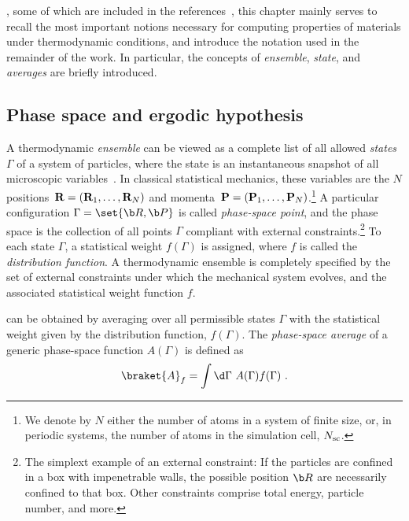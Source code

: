 , some of which are included in the references~\cite{Phillies2012,Tuckerman,Schrodinger1989}, this chapter mainly serves to recall the most important notions necessary for computing properties of materials under thermodynamic conditions, and introduce the notation used in the remainder of the work. In particular, the concepts of \emph{ensemble}, \emph{state}, and \emph{averages} are briefly introduced.

\subsection{Phase space and ergodic hypothesis}
\label{sec:phase_space}

A thermodynamic \emph{ensemble} can be viewed as a complete list of all allowed \emph{states} $\Gamma$ of a system of particles, where the state is an instantaneous snapshot of all microscopic variables~\cite{Phillies2012}. In classical statistical mechanics, these variables are the $N$ positions~${\bf R} = ({\bf R}_1, \ldots, {\bf R}_{N})$ and momenta~${\bf P} = ({\bf P}_1, \ldots, {\bf P}_{N})$.\footnote{We denote by $N$ either the number of atoms in a system of finite size, or, in periodic systems, the number of atoms in the simulation cell, $N_{\rm sc}$.} A particular configuration $\Gamma = \set{\b R, \b P}$ is called \emph{phase-space point}, and the phase space is the collection of all points $\Gamma$ compliant with external constraints.\footnote{The simplext example of an external constraint: If the particles are confined in a box with impenetrable walls, the possible position $\b R$ are necessarily confined to that box. Other constraints comprise total energy, particle number, and more.} To each state $\Gamma$, a statistical weight $f (\Gamma)$ is assigned, where $f$ is called the \emph{distribution function}. A thermodynamic ensemble is completely specified by the set of external constraints under which the mechanical system evolves, and the associated statistical weight function $f$.

 can be obtained by averaging over all permissible states $\Gamma$ with the statistical weight given by the distribution function, $f (\Gamma)$. The \emph{phase-space average} of a generic phase-space function $A (\Gamma)$ is defined as
\begin{align}
  \braket{A}_f 
    = \int \d \Gamma ~ A(\Gamma) f (\Gamma)~.
  \label{eq:phase.space.average}
\end{align}

